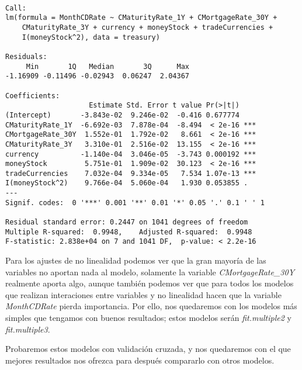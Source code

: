 \documentclass[11pt]{article}
\begin{document}
    
    \begin{verbatim}

Call:
lm(formula = MonthCDRate ~ CMaturityRate_1Y + CMortgageRate_30Y + 
    CMaturityRate_3Y + currency + moneyStock + tradeCurrencies + 
    I(moneyStock^2), data = treasury)

Residuals:
     Min       1Q   Median       3Q      Max 
-1.16909 -0.11496 -0.02943  0.06247  2.04367 

Coefficients:
                    Estimate Std. Error t value Pr(>|t|)    
(Intercept)       -3.843e-02  9.246e-02  -0.416 0.677774    
CMaturityRate_1Y  -6.692e-03  7.878e-04  -8.494  < 2e-16 ***
CMortgageRate_30Y  1.552e-01  1.792e-02   8.661  < 2e-16 ***
CMaturityRate_3Y   3.310e-01  2.516e-02  13.155  < 2e-16 ***
currency          -1.140e-04  3.046e-05  -3.743 0.000192 ***
moneyStock         5.751e-01  1.909e-02  30.123  < 2e-16 ***
tradeCurrencies    7.032e-04  9.334e-05   7.534 1.07e-13 ***
I(moneyStock^2)    9.766e-04  5.060e-04   1.930 0.053855 .  
---
Signif. codes:  0 '***' 0.001 '**' 0.01 '*' 0.05 '.' 0.1 ' ' 1

Residual standard error: 0.2447 on 1041 degrees of freedom
Multiple R-squared:  0.9948,	Adjusted R-squared:  0.9948 
F-statistic: 2.838e+04 on 7 and 1041 DF,  p-value: < 2.2e-16

    \end{verbatim}

    
    Para los ajustes de no linealidad podemos ver que la gran mayoría de las
variables no aportan nada al modelo, solamente la variable
\emph{CMortgageRate\_30Y} realmente aporta algo, aunque también podemos
ver que para todos los modelos que realizan interaciones entre variables
y no linealidad hacen que la variable \emph{MonthCDRate} pierda
importancia. Por ello, nos quedaremos con los modelos más simples que
tengamos con buenos resultados; estos modelos serán \emph{fit.multiple2}
y \emph{fit.multiple3}.

Probaremos estos modelos con validación cruzada, y nos quedaremos con el
que mejores resultados nos ofrezca para después compararlo con otros
modelos.
\end{document}
